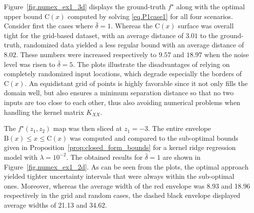 Figure~\ref{fig.numex_ex1_3d} displays the ground-truth $f^\star$ along with the optimal upper bound C$(x)$ computed by solving \eqref{eq.P1case1} for all four scenarios. Consider first the cases where $\bar \delta = 1$. Whereas the $\text{C}(x)$ surface was overall tight for the grid-based dataset, with an average distance of $3.01$ to the ground-truth, randomized data yielded a less regular bound with an average distance of $8.02$. These numbers were increased respectively to $9.57$ and $18.97$ when the noise level was risen to $\bar \delta = 5$. The plots illustrate the disadvantages of relying on completely randomized input locations, which degrade especially the borders of $\text{C}(x)$. An equidistant grid of points is highly favorable since it not only fills the domain well, but also ensures a minimum separation distance so that no two inputs are too close to each other, thus also avoiding numerical problems when handling the kernel matrix $K_{XX}$. 

The $f^\star(z_1,z_2)$ map was then sliced at $z_1 = -3$. The entire envelope $\text{B}(x) \leq x \leq \text{C}(x)$ was computed and compared to the sub-optimal bounds given in Proposition~\ref{prop:closed_form_bounds} for a kernel ridge regression model with $\lambda = 10^{-2}$. The obtained results for $\bar\delta = 1$ are shown in Figure~\ref{fig.numex_ex1_2d}. As can be seen from the plots, the optimal approach yielded tighter uncertainty intervals that were always within the sub-optimal ones. Moreover, whereas the average width of the red envelope was 8.93 and 18.96 respectively in the grid and random cases, the dashed black envelope displayed average widths of 21.13 and 34.62.

